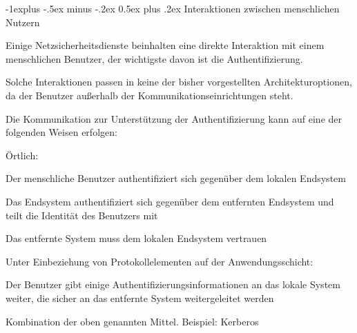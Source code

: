 \documentclass[a4paper]{article}
\makeatletter
\renewcommand{\subsection}{\@startsection{subsection}{2}{0mm}%
 {-1explus -.5ex minus -.2ex}%
 {0.5ex plus .2ex}%
 {\normalfont\normalsize\bfseries}}
\makeatother
\begin{document}
\begin{multicols}{3}
      \subsection{Interaktionen zwischen menschlichen Nutzern}
      \begin{itemize*}
            \item Einige Netzsicherheitsdienste beinhalten eine direkte Interaktion mit einem menschlichen Benutzer, der wichtigste davon ist die Authentifizierung.
            \item Solche Interaktionen passen in keine der bisher vorgestellten Architekturoptionen, da der Benutzer außerhalb der Kommunikationseinrichtungen steht.
            \item Die Kommunikation zur Unterstützung der Authentifizierung kann auf eine der folgenden Weisen erfolgen:
            \begin{itemize*}
                  \item Örtlich:
                  \begin{itemize*}
                        \item Der menschliche Benutzer authentifiziert sich gegenüber dem lokalen Endsystem
                        \item Das Endsystem authentifiziert sich gegenüber dem entfernten Endsystem und teilt die Identität des Benutzers mit
                        \item Das entfernte System muss dem lokalen Endsystem vertrauen
                  \end{itemize*}
                  \item Unter Einbeziehung von Protokollelementen auf der Anwendungsschicht:
                  \begin{itemize*}
                        \item Der Benutzer gibt einige Authentifizierungsinformationen an das lokale System weiter, die sicher an das entfernte System weitergeleitet werden
                  \end{itemize*}
                  \item Kombination der oben genannten Mittel. Beispiel: Kerberos
            \end{itemize*}
      \end{itemize*}


\end{multicols}
\end{document}
